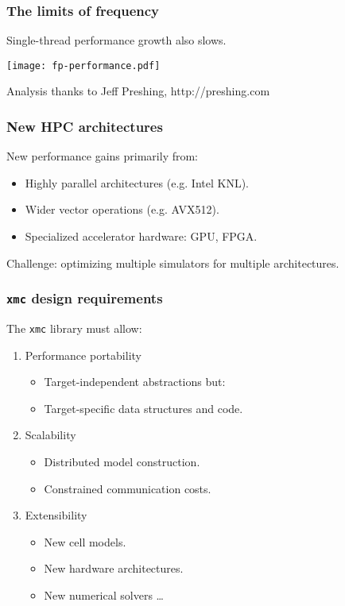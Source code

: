 \documentclass[aspectratio=43,12pt]{beamer}
\newcommand{\xmc}{\texttt{xmc}\xspace}
\begin{document}
\begin{frame}
\frametitle{The limits of frequency}
\vfill
Single-thread performance growth also slows.

\vfill
\texttt{[image: fp-performance.pdf]}

\vfill
\hfill{\scriptsize Analysis thanks to Jeff Preshing, http://preshing.com}
\end{frame}

\begin{frame}
\frametitle{New HPC architectures}

\vfill
New performance gains primarily from:

\vfill
\begin{itemize}
\item Highly parallel architectures (e.g. Intel KNL).
\item Wider vector operations (e.g. AVX512).
\item Specialized accelerator hardware: GPU, FPGA.
\end{itemize}

\vfill
Challenge: optimizing multiple simulators for multiple architectures.
\vfill
\end{frame}



\begin{frame}
\frametitle{\xmc{} design requirements}


The \xmc{} library must allow:
\begin{enumerate}
\item
Performance portability
\pause
\begin{itemize}
\item Target-independent abstractions but:
\item Target-specific data structures and code.
\end{itemize}
\item
\pause
Scalability
\pause
\begin{itemize}
\item Distributed model construction.
\item Constrained communication costs.
\end{itemize}
\pause
\item
Extensibility
\pause
\begin{itemize}
\item New cell models.
\item New hardware architectures.
\item New numerical solvers \dots
\end{itemize}
\end{enumerate}

\end{frame}
\end{document}
